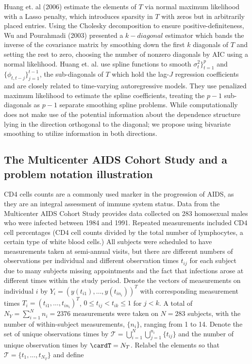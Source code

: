 Huang et. al (2006) estimate the elements of $T$ via normal maximum likelihood with a Lasso penalty, which introduces sparsity in $T$ with zeros but in arbitrarily placed entries. Using the Cholesky decomposition to ensure positive-definiteness, Wu and Pourahmadi (2003) presented a $k-diagonal$ estimator which bands the inverse of the covariance matrix by smoothing down the first $k$ diagonals of $T$ and setting the rest to zero, choosing the number of nonzero diagonals by AIC using a normal likelihood. Huang et. al. use spline functions to smooth $\sigma_t^2\rbrace_{t=1}^p$ and $\lbrace \phi_{t,t-j} \rbrace_{j=1}^{t-1}$, the sub-diagonals of $T$ which hold the lag-$J$ regression coefficients and are closely related to time-varying autoregressive models. They use penalized maximum likelihood to estimate the spline coefficients, treating the $p-1$ sub-diagonals as $p-1$ separate smoothing spline problems. While computationally  does not make use of the potential information about the dependence structure lying in the direction orthogonal to the diagonal; we propose using bivariate smoothing to utilize information in both directions.


\subsection{The Multicenter AIDS Cohort Study and a problem notation illustration}

CD4 cells counts are a commonly used marker in the progression of AIDS, as they are an integral assessment of immune system status. Data from the Multicenter AIDS Cohort Study provides data collected on 283 homosexual males who were infected between 1984 and 1991. Repeated measurements included CD4 cell percentages (CD4 cell counts divided by the total number of lymphocytes, a certain type of white blood cells.) All subjects were scheduled to have measurements taken at semi-annual visits, but there are different numbers of observations per individual and different observation times $t_{ij}$ for each subject due to many subjects missing appointments and the fact that infections arose at different times within the study period.  Denote the vectors of measurements on individual $i$ by $Y_i = \left( y\left(t_{i1}\right), \dots, y\left(t_{i n_i}\right) \right)^T$ with corresponding measurement times  $T_i = \left(t_{i1},\dots, t_{i n_i}  \right)^T$, $0 \le t_{ij} < t_{ik} \le 1$ for $j < k$. A total of $N_Y = \sum_{i=1}^N n_i = 2376$ measurements were taken on $N=283$ subjects, with the number of within-subject measurements, $\lbrace n_i \rbrace$, ranging from 1 to 14.  Denote the set of unique observations times by $ \mathcal{T} = \bigcup_{i=1}^N \bigcup_{j=1}^{n_i} \lbrace t_{ij} \rbrace$ and the number of unique observation times by $\cardT = N_T$. Relabel the elements so that $\mathcal{T} = \lbrace t_1, \dots, t_{N_T} \rbrace$ and define

